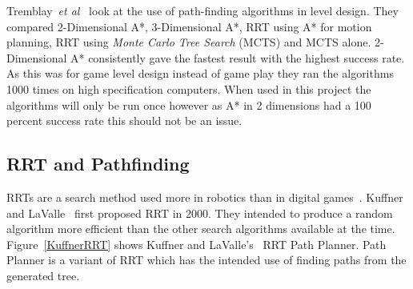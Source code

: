 \documentclass[journal]{IEEEtran}
\begin{document}
Tremblay~\textit{et al}~\cite{Tremblay2014} look at the use of path-finding algorithms in level design. They compared 2-Dimensional A*, 3-Dimensional A*, RRT using A* for motion planning, RRT using \textit{Monte Carlo Tree Search} (MCTS) and MCTS alone. 2-Dimensional A* consistently gave the fastest result with the highest success rate. As this was for game level design instead of game play they ran the algorithms 1000 times on high specification computers. When used in this project the algorithms will only be run once however as A* in 2 dimensions had a 100 percent success rate this should not be an issue. 

\subsection{RRT and Pathfinding} \label{RRTadnPathfinding}
RRTs are a search method used more in robotics than in digital games~\cite{LaValle1998,Kuffner2000}. Kuffner and LaValle~\cite{Kuffner2000} first proposed RRT in 2000. They intended to produce a random algorithm more efficient than the other search algorithms available at the time.  Figure~\ref{KuffnerRRT} shows Kuffner and LaValle's~\cite{Kuffner2000} RRT Path Planner. Path Planner is a variant of RRT which has the intended use of finding paths from the generated tree.
\end{document}
